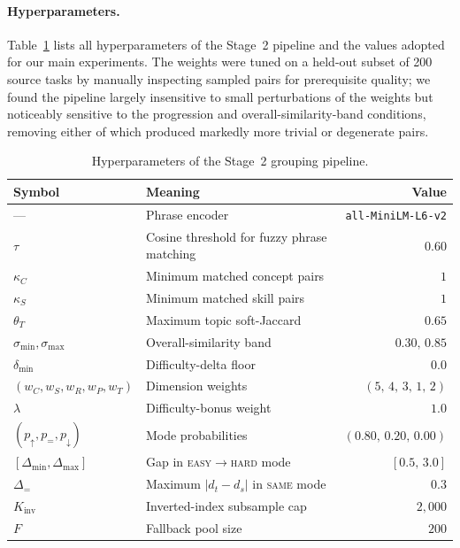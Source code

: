 \paragraph{Hyperparameters.}
Table~\ref{tab:group_hparams} lists all hyperparameters of the Stage~2 pipeline and the values adopted for our main experiments. The weights were tuned on a held-out subset of 200 source tasks by manually inspecting sampled pairs for prerequisite quality; we found the pipeline largely insensitive to small perturbations of the weights but noticeably sensitive to the progression and overall-similarity-band conditions, removing either of which produced markedly more trivial or degenerate pairs.
 
\begin{table}[h]
\centering\small
\caption{Hyperparameters of the Stage~2 grouping pipeline.}\label{tab:group_hparams}
\begin{tabular}{llr}
\toprule
Symbol & Meaning & Value \\
\midrule
---                      & Phrase encoder                                & \texttt{all-MiniLM-L6-v2} \\
$\tau$                   & Cosine threshold for fuzzy phrase matching    & $0.60$ \\
$\kappa_C$               & Minimum matched concept pairs                 & $1$ \\
$\kappa_S$               & Minimum matched skill pairs                   & $1$ \\
$\theta_T$               & Maximum topic soft-Jaccard                    & $0.65$ \\
$\sigma_{\min},\sigma_{\max}$ & Overall-similarity band                  & $0.30,\,0.85$ \\
$\delta_{\min}$          & Difficulty-delta floor                        & $0.0$ \\
$(w_C,w_S,w_R,w_P,w_T)$  & Dimension weights & $(5,\,4,\,3,\,1,\,2)$ \\
$\lambda$                & Difficulty-bonus weight                       & $1.0$ \\
$(p_\uparrow,p_=,p_\downarrow)$ & Mode probabilities                     & $(0.80,\,0.20,\,0.00)$ \\
$[\Delta_{\min},\Delta_{\max}]$ & Gap in \textsc{easy$\rightarrow$hard} mode & $[0.5,\,3.0]$ \\
$\Delta_=$               & Maximum $|d_t-d_s|$ in \textsc{same} mode     & $0.3$ \\
$K_{\text{inv}}$         & Inverted-index subsample cap                  & $2{,}000$ \\
$F$                      & Fallback pool size                            & $200$ \\
\bottomrule
\end{tabular}
\end{table}

